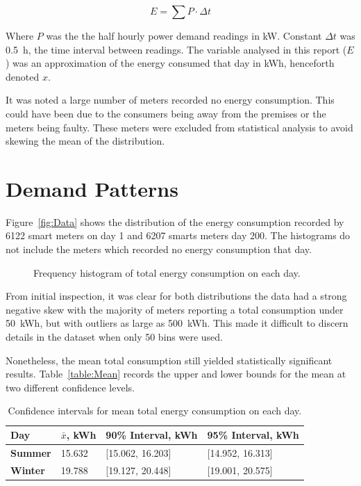 \documentclass[a4paper,10pt,twocolumn]{article}
\begin{document}
\begin{equation}
    E = \sum{P \cdot \Delta t}
    \label{eq:Integrate}
\end{equation}

Where $P$ was the the half hourly power demand readings in kW. Constant $\Delta 
t$ was 0.5~h, the time interval between readings. The variable analysed in this 
report ($E$) was an approximation of the energy consumed that day in kWh, 
henceforth denoted $x$.

It was noted a large number of meters recorded no energy consumption. This 
could have been due to the consumers being away from the premises or the meters 
being faulty. These meters were excluded from statistical analysis to avoid 
skewing the mean of the distribution.

\section{Demand Patterns}

Figure~\vref{fig:Data} shows the distribution of the energy consumption 
recorded by 6122 smart meters on day 1 and 6207 smarts meters day 200. The 
histograms do not include the meters which recorded no energy consumption that 
day.
    
\begin{figure}[h]
    \centering
    \def\svgwidth{0.5\textwidth}
    
    \caption{Frequency histogram of total energy consumption on each day.}
    \label{fig:Data}
\end{figure}

From initial inspection, it was clear for both distributions the data had a 
strong negative skew with the majority of meters reporting a total consumption 
under 50~kWh, but with outliers as large as 500~kWh. This made it difficult to 
discern details in the dataset when only 50 bins were used.

Nonetheless, the mean total consumption still yielded statistically significant 
results. Table~\vref{table:Mean} records the upper and lower bounds for the 
mean at two different confidence levels.

\begin{table}[h]
    \centering
    \caption{Confidence intervals for mean total energy consumption on each 
        day.\vspace{-\parsep}}
    \begin{tabular}{llll}
        \toprule
        \textbf{Day} & $\bar{x}$, \tiny{kWh} & 90\% Interval, \tiny{kWh} & 95\% 
        Interval, \tiny{kWh} \\
        \midrule
        \textbf{Summer} & 15.632 & [15.062, 16.203] & [14.952, 16.313] \\
        \textbf{Winter} & 19.788 & [19.127, 20.448] & [19.001, 20.575] \\
        \bottomrule
    \end{tabular}
    \label{table:Mean}
\end{table}
\end{document}
